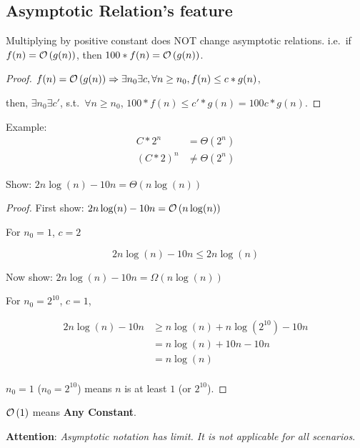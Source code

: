 \subsection{Asymptotic Relation's feature}
\begin{theorem}
Multiplying by positive constant does NOT change asymptotic relations.
i.e.\ if $f(n) = \mathcal{O}\left(g(n)\right)$, then $100 * f(n) = \mathcal{O}\left(g(n)\right)$.
\end{theorem}

\begin{proof}
$f(n) = \mathcal{O}\left(g(n)\right) \Rightarrow \exists{n_0} \exists c, \forall n \geq n_0, f(n) \leq c*g(n)$,

then, $\exists{n_0}\exists{c'}$, s.t.\ $\forall n \geq n_0$, $100*f(n) \leq c'*g(n) = 100c*g(n)$.
\end{proof}

Example:
\begin{align}
C*2^n & = \Theta(2^n) \\
(C*2)^n & \neq \Theta(2^n)
\end{align}

\begin{claim}
Show: $2n\log(n) - 10n = \Theta(n\log(n))$
\end{claim}

\begin{proof}
First show: $2n\log(n) - 10n = \mathcal{O}\left(n\log(n)\right)$

For $n_0 = 1$, $c = 2$

\[2n\log(n) - 10n \leq 2n\log(n)\]

Now show: $2n\log(n) - 10n = \Omega(n\log(n))$

For $n_0 = 2^10$, $c = 1$,

\[
\begin{split}
2n\log(n) - 10n & \geq n\log(n) + n \log(2^{10}) - 10n \\
& =n \log(n) + 10n - 10n \\
& =n\log(n) \\
\end{split}
\]

$n_0 = 1$ ($n_0 = 2^{10}$) means $n$ is at least $1$ (or $2^{10}$).
\end{proof}

\begin{corollary}
$\mathcal{O}\left(1\right)$ means \textbf{Any Constant}.
\end{corollary}

\noindent\textbf{Attention}: \emph{Asymptotic notation has limit. It is not applicable for all scenarios}.

